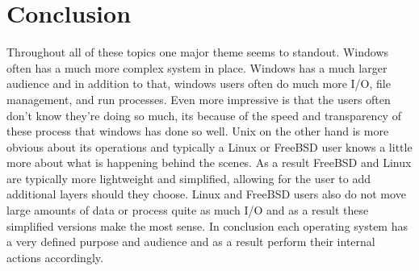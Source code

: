 \documentclass[a4paper,10pt,onecolumn]{article}
\begin{document}
\section{Conclusion}
Throughout all of these topics one major theme seems to standout. Windows often has a much more complex system in place. Windows has a much larger audience and in addition to that, windows users often do much more I/O, file management, and run processes. Even more impressive is that the users often don't know they're doing so much, its because of the speed and transparency of these process that windows has done so well. Unix on the other hand is more obvious about its operations and typically a Linux or FreeBSD user knows a little more about what is happening behind the scenes. As a result FreeBSD and Linux are typically more lightweight and simplified, allowing for the user to add additional layers should they choose. Linux and FreeBSD users also do not move large amounts of data or process quite as much I/O and as a result these simplified versions make the most sense. 
\newline
In conclusion each operating system has a very defined purpose and audience and as a result perform their internal actions accordingly.



\end{document}
